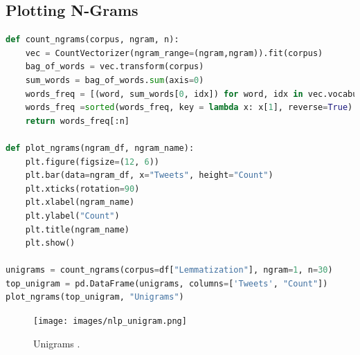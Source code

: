 \newpage

\subsection{Plotting N-Grams}
\begin{lstlisting}[language=Python]
def count_ngrams(corpus, ngram, n):
    vec = CountVectorizer(ngram_range=(ngram,ngram)).fit(corpus)
    bag_of_words = vec.transform(corpus)
    sum_words = bag_of_words.sum(axis=0)
    words_freq = [(word, sum_words[0, idx]) for word, idx in vec.vocabulary_.items()]
    words_freq =sorted(words_freq, key = lambda x: x[1], reverse=True)
    return words_freq[:n]
    
def plot_ngrams(ngram_df, ngram_name):
    plt.figure(figsize=(12, 6))
    plt.bar(data=ngram_df, x="Tweets", height="Count")
    plt.xticks(rotation=90)
    plt.xlabel(ngram_name)
    plt.ylabel("Count")
    plt.title(ngram_name)
    plt.show()
    
unigrams = count_ngrams(corpus=df["Lemmatization"], ngram=1, n=30)
top_unigram = pd.DataFrame(unigrams, columns=['Tweets', "Count"])
plot_ngrams(top_unigram, "Unigrams")
\end{lstlisting}

\begin{figure}[ht]
    \centering
    \texttt{[image: images/nlp\_unigram.png]}
    \caption{Unigrams .}
    \label{fig:enter-label}
\end{figure}

\newpage
